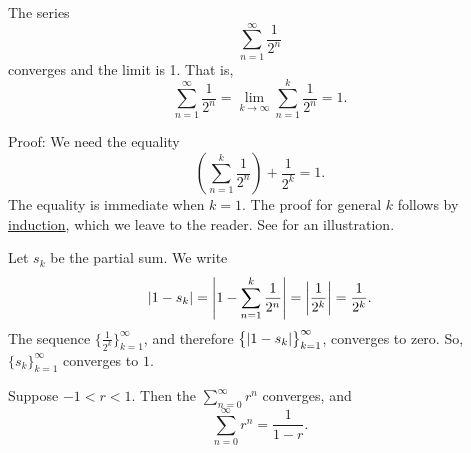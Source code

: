 \begin{example}
The series
\begin{equation*}
\sum_{n=1}^\infty \frac{1}{2^n}
\end{equation*}
converges and the limit is 1.  That is,
\begin{equation*}
\sum_{n=1}^\infty \frac{1}{2^n} = 
\lim_{k\to\infty} \sum_{n=1}^k \frac{1}{2^n} = 
1 .
\end{equation*}

Proof: We need the equality
\begin{equation*}
\left( \sum_{n=1}^k \frac{1}{2^n} \right)
+ \frac{1}{2^k}
= 1 .
\end{equation*}
The equality is immediate when $k=1$.  The proof for general $k$
follows by \hyperref[induction:thm]{induction}, which we leave to the
reader.  See  for an illustration.
\begin{myfigureht}
\caption{The equality 
$\left( \sum_{n=1}^k \frac{1}{2^n} \right)
+ \frac{1}{2^k}
= 1$ illustrated for $k=3$.\label{figcutseries}}
\end{myfigureht}

Let $s_k$ be the partial sum.  We write
\begin{equation*}
\lvert {
1 - s_k 
} \rvert
=
\left\lvert {
1 - 
\sum_{n=1}^k \frac{1}{2^n}
} \right\rvert
=
\left\lvert {\frac{1}{2^k}} \right\rvert = 
\frac{1}{2^k} .
\end{equation*}
The sequence $\bigl\{ \frac{1}{2^k} \bigr\}_{k=1}^\infty$, and
therefore $\bigl\{ \lvert {1-s_k} \rvert \bigr\}_{k=1}^\infty$,
converges to zero.  So, $\{ s_k \}_{k=1}^\infty$ converges to $1$.
\end{example}

\begin{prop} \label{geometric:prop}
Suppose
$-1 < r < 1$.  Then the \emph{}
$\sum_{n=0}^\infty r^n$ converges, and
\begin{equation*}
\sum_{n=0}^\infty r^n = \frac{1}{1-r} .
\end{equation*}
\end{prop}

